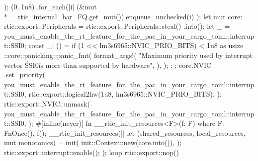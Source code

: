 {{{{                });
            (0..1u8)
                .for_each(|i| {
                    (&mut *__rtic_internal_bar_FQ.get_mut()).enqueue_unchecked(i)
                });
            let mut core: rtic::export::Peripherals = rtic::export::Peripherals::steal()
                .into();
            let _ = you_must_enable_the_rt_feature_for_the_pac_in_your_cargo_toml::interrupt::SSI0;
            const _: () = if (1 << lm3s6965::NVIC_PRIO_BITS) < 1u8 as usize {
                {
                    ::core::panicking::panic_fmt(
                        format_args!(
                            "Maximum priority used by interrupt vector \'SSI0\' is more than supported by hardware",
                        ),
                    );
                };
            };
            core.NVIC
                .set_priority(
                    you_must_enable_the_rt_feature_for_the_pac_in_your_cargo_toml::interrupt::SSI0,
                    rtic::export::logical2hw(1u8, lm3s6965::NVIC_PRIO_BITS),
                );
            rtic::export::NVIC::unmask(
                you_must_enable_the_rt_feature_for_the_pac_in_your_cargo_toml::interrupt::SSI0,
            );
            #[inline(never)]
            fn __rtic_init_resources<F>(f: F)
            where
                F: FnOnce(),
            {
                f();
            }
            __rtic_init_resources(|| {
                let (shared_resources, local_resources, mut monotonics) = init(
                    init::Context::new(core.into()),
                );
                rtic::export::interrupt::enable();
            });
            loop {
                rtic::export::nop()
            }
        }
    }
}
